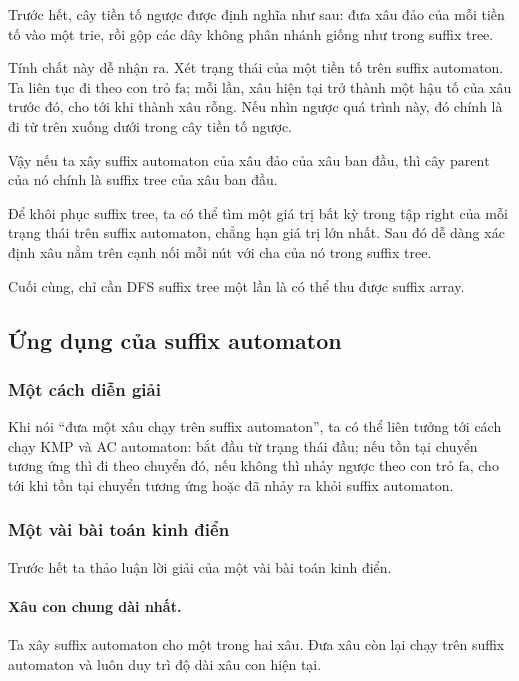 \documentclass[11pt]{article}
\begin{document}
Trước hết, cây tiền tố ngược được định nghĩa như sau: đưa xâu đảo của mỗi tiền
tố vào một trie, rồi gộp các dây không phân nhánh giống như trong suffix tree.

Tính chất này dễ nhận ra. Xét trạng thái của một tiền tố trên suffix automaton.
Ta liên tục đi theo con trỏ \(\mathrm{fa}\); mỗi lần, xâu hiện tại trở thành
một hậu tố của xâu trước đó, cho tới khi thành xâu rỗng. Nếu nhìn ngược quá
trình này, đó chính là đi từ trên xuống dưới trong cây tiền tố ngược.

Vậy nếu ta xây suffix automaton của xâu đảo của xâu ban đầu, thì cây
\(\mathrm{parent}\) của nó chính là suffix tree của xâu ban đầu.

Để khôi phục suffix tree, ta có thể tìm một giá trị bất kỳ trong tập
\(\mathrm{right}\) của mỗi trạng thái trên suffix automaton, chẳng hạn giá trị
lớn nhất. Sau đó dễ dàng xác định xâu nằm trên cạnh nối mỗi nút với cha của nó
trong suffix tree.

Cuối cùng, chỉ cần DFS suffix tree một lần là có thể thu được suffix array.

\subsection{Ứng dụng của suffix automaton}

\subsubsection{Một cách diễn giải}

Khi nói ``đưa một xâu chạy trên suffix automaton'', ta có thể liên tưởng tới
cách chạy KMP và AC automaton: bắt đầu từ trạng thái đầu; nếu tồn tại chuyển
tương ứng thì đi theo chuyển đó, nếu không thì nhảy ngược theo con trỏ
\(\mathrm{fa}\), cho tới khi tồn tại chuyển tương ứng hoặc đã nhảy ra khỏi
suffix automaton.

\subsubsection{Một vài bài toán kinh điển}

Trước hết ta thảo luận lời giải của một vài bài toán kinh điển.

\paragraph{Xâu con chung dài nhất.}
Ta xây suffix automaton cho một trong hai xâu. Đưa xâu còn lại chạy trên suffix
automaton và luôn duy trì độ dài xâu con hiện tại.
\end{document}
